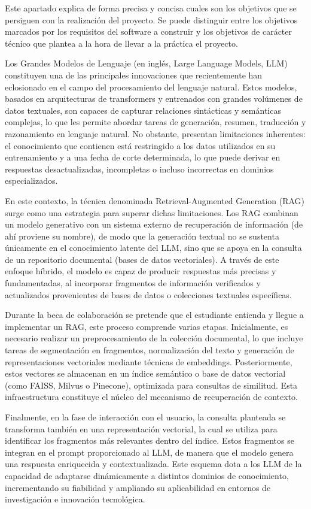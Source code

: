 
Este apartado explica de forma precisa y concisa cuales son los objetivos que se persiguen con la realización del proyecto. Se puede distinguir entre los objetivos marcados por los requisitos del software a construir y los objetivos de carácter técnico que plantea a la hora de llevar a la práctica el proyecto.

Los Grandes Modelos de Lenguaje (en inglés, Large Language Models, LLM) constituyen una de las principales innovaciones que recientemente han eclosionado en el campo del procesamiento del lenguaje natural. Estos modelos, basados en arquitecturas de transformers y entrenados con grandes volúmenes de datos textuales, son capaces de capturar relaciones sintácticas y semánticas complejas, lo que les permite abordar tareas de generación, resumen, traducción y razonamiento en lenguaje natural. No obstante, presentan limitaciones inherentes: el conocimiento que contienen está restringido a los datos utilizados en su entrenamiento y a una fecha de corte determinada, lo que puede derivar en respuestas desactualizadas, incompletas o incluso incorrectas en dominios especializados.

En este contexto, la técnica denominada Retrieval-Augmented Generation (RAG) surge como una estrategia para superar dichas limitaciones. Los RAG combinan un modelo generativo con un sistema externo de recuperación de información (de ahí proviene su nombre), de modo que la generación textual no se sustenta únicamente en el conocimiento latente del LLM, sino que se apoya en la consulta de un repositorio documental (bases de datos vectoriales). A través de este enfoque híbrido, el modelo es capaz de producir respuestas más precisas y fundamentadas, al incorporar fragmentos de información verificados y actualizados provenientes de bases de datos o colecciones textuales específicas.

Durante la beca de colaboración se pretende que el estudiante entienda y llegue a implementar un RAG, este proceso comprende varias etapas. Inicialmente, es necesario realizar un preprocesamiento de la colección documental, lo que incluye tareas de segmentación en fragmentos, normalización del texto y generación de representaciones vectoriales mediante técnicas de embeddings. Posteriormente, estos vectores se almacenan en un índice semántico o base de datos vectorial (como FAISS, Milvus o Pinecone), optimizada para consultas de similitud. Esta infraestructura constituye el núcleo del mecanismo de recuperación de contexto.

Finalmente, en la fase de interacción con el usuario, la consulta planteada se transforma también en una representación vectorial, la cual se utiliza para identificar los fragmentos más relevantes dentro del índice. Estos fragmentos se integran en el prompt proporcionado al LLM, de manera que el modelo genera una respuesta enriquecida y contextualizada. Este esquema dota a los LLM de la capacidad de adaptarse dinámicamente a distintos dominios de conocimiento, incrementando su fiabilidad y ampliando su aplicabilidad en entornos de investigación e innovación tecnológica.


